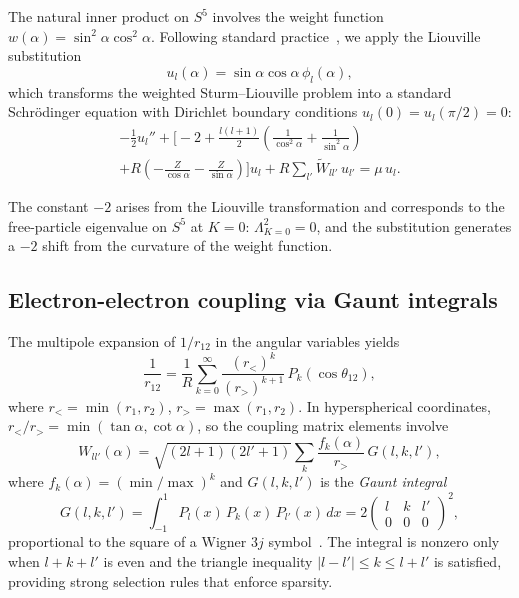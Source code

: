 \documentclass[aps,pra,twocolumn,superscriptaddress,longbibliography]{revtex4-2}
\begin{document}
The natural inner product on $S^5$ involves the weight function
$w(\alpha) = \sin^2\!\alpha\cos^2\!\alpha$.  Following standard
practice~\cite{Lin1995}, we apply the Liouville substitution
\begin{equation}
  u_l(\alpha) = \sin\alpha\cos\alpha\,\phi_l(\alpha),
  \label{eq:liouville}
\end{equation}
which transforms the weighted Sturm--Liouville problem into a
standard Schr\"odinger equation with Dirichlet boundary conditions
$u_l(0) = u_l(\pi/2) = 0$:
\begin{multline}
  -\frac{1}{2}u_l''
  + \biggl[-2 + \frac{l(l+1)}{2}
  \!\left(\frac{1}{\cos^2\!\alpha}
  + \frac{1}{\sin^2\!\alpha}\right) \\
  + R\!\left(-\frac{Z}{\cos\alpha}
  - \frac{Z}{\sin\alpha}\right)\biggr]\!u_l
  + R\sum_{l'} \tilde{W}_{ll'}\,u_{l'}
  = \mu\,u_l.
  \label{eq:liouville_eq}
\end{multline}

The constant $-2$ arises from the Liouville transformation and
corresponds to the free-particle eigenvalue on $S^5$ at $K = 0$:
$\Lambda^2_{K=0} = 0$, and the substitution generates a
$-2$ shift from the curvature of the weight function.

\subsection{Electron-electron coupling via Gaunt integrals}

The multipole expansion of $1/r_{12}$ in the angular
variables yields
\begin{equation}
  \frac{1}{r_{12}} = \frac{1}{R}\sum_{k=0}^{\infty}
  \frac{(r_<)^k}{(r_>)^{k+1}}\,P_k(\cos\theta_{12}),
  \label{eq:multipole}
\end{equation}
where $r_< = \min(r_1, r_2)$, $r_> = \max(r_1, r_2)$.  In
hyperspherical coordinates, $r_</r_> = \min(\tan\alpha,
\cot\alpha)$, so the coupling matrix elements involve
\begin{equation}
  W_{ll'}(\alpha) = \sqrt{(2l+1)(2l'+1)}\sum_k
  \frac{f_k(\alpha)}{r_>}\,G(l, k, l'),
  \label{eq:Wll}
\end{equation}
where $f_k(\alpha) = (\min/\max)^k$ and $G(l, k, l')$ is the
\emph{Gaunt integral}
\begin{equation}
  G(l, k, l') = \int_{-1}^{1} P_l(x)\,P_k(x)\,P_{l'}(x)\,dx
  = 2\begin{pmatrix} l & k & l' \\ 0 & 0 & 0\end{pmatrix}^{\!2},
  \label{eq:gaunt}
\end{equation}
proportional to the square of a Wigner $3j$
symbol~\cite{Varshalovich1988}.  The integral is nonzero only when
$l + k + l'$ is even and the triangle inequality $|l - l'| \leq k
\leq l + l'$ is satisfied, providing strong selection rules that
enforce sparsity.
\end{document}
